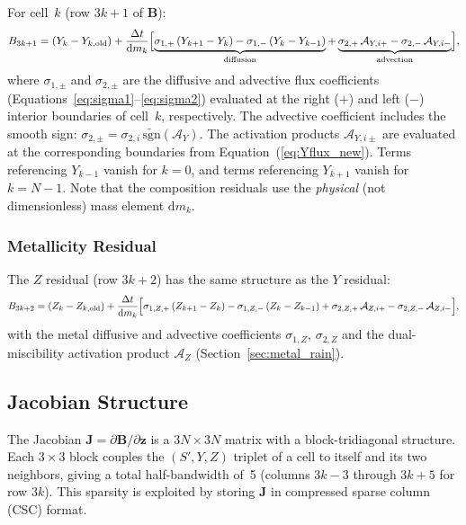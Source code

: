 \documentclass{aastex631}
\newcommand{\dd}{\mathrm{d}}
\newcommand{\pp}{\partial}
\begin{document}
For cell~$k$ (row $3k+1$ of $\mathbf{B}$):
\begin{equation}\label{eq:BY}
  B_{3k+1}
  = (Y_k - Y_{k,\rm old})
  + \frac{\Delta t}{\dd m_k}\Bigl[
      \underbrace{\sigma_{1,+}\,(Y_{k+1}-Y_k)
                - \sigma_{1,-}\,(Y_k-Y_{k-1})}_{\text{diffusion}}
    + \underbrace{\sigma_{2,+}\,\mathcal{A}_{Y,i+}
                - \sigma_{2,-}\,\mathcal{A}_{Y,i-}}_{\text{advection}}
  \Bigr],
\end{equation}
where $\sigma_{1,\pm}$ and $\sigma_{2,\pm}$ are the diffusive and
advective flux coefficients (Equations~\ref{eq:sigma1}--\ref{eq:sigma2})
evaluated at the right ($+$) and left ($-$) interior boundaries of
cell~$k$, respectively.  The advective coefficient includes the smooth
sign: $\sigma_{2,\pm} = \sigma_{2,i}\,\widetilde{\mathrm{sgn}}(\mathcal{A}_Y)$.
The activation products $\mathcal{A}_{Y,i\pm}$ are evaluated at the
corresponding boundaries from Equation~(\ref{eq:Yflux_new}).
Terms referencing $Y_{k-1}$ vanish for $k=0$, and terms referencing
$Y_{k+1}$ vanish for $k=N-1$.  Note that the composition residuals use
the \emph{physical} (not dimensionless) mass element $\dd m_k$.

\subsubsection{Metallicity Residual}

The $Z$ residual (row $3k+2$) has the same structure as the $Y$
residual:
\begin{equation}\label{eq:BZ}
  B_{3k+2}
  = (Z_k - Z_{k,\rm old})
  + \frac{\Delta t}{\dd m_k}\Bigl[
      \sigma_{1,Z,+}\,(Z_{k+1}-Z_k)
    - \sigma_{1,Z,-}\,(Z_k-Z_{k-1})
    + \sigma_{2,Z,+}\,\mathcal{A}_{Z,i+}
    - \sigma_{2,Z,-}\,\mathcal{A}_{Z,i-}
  \Bigr],
\end{equation}
with the metal diffusive and advective coefficients $\sigma_{1,Z}$,
$\sigma_{2,Z}$ and the dual-miscibility activation product
$\mathcal{A}_Z$ (Section~\ref{sec:metal_rain}).

\subsection{Jacobian Structure}\label{sec:jacobian}

The Jacobian $\mathbf{J} = \pp\mathbf{B}/\pp\mathbf{z}$ is a
$3N\times 3N$ matrix with a block-tridiagonal structure.  Each
$3\times 3$ block couples the $(S', Y, Z)$ triplet of a cell to
itself and its two neighbors, giving a total half-bandwidth of~5
(columns $3k-3$ through $3k+5$ for row $3k$).  This sparsity is
exploited by storing $\mathbf{J}$ in compressed sparse column (CSC)
format.
\end{document}
